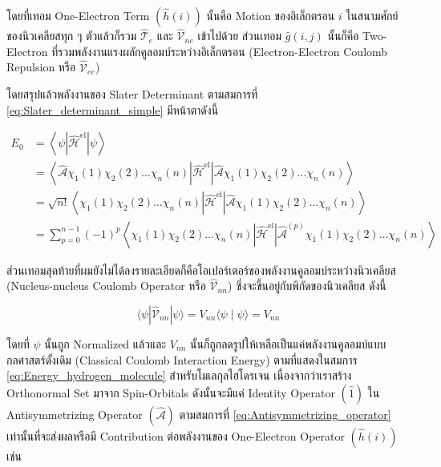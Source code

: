 \noindent โดยที่เทอม One-Electron Term $(\hat{h}(i))$ นั้นคือ Motion ของอิเล็กตรอน $i$ ในสนามศักย์ของนิวเคลียสทุก ๆ
ตัวแล้วก็รวม $\hat{\mathscr{T}}_e$ และ $\hat{\mathscr{V}}_{n e}$ เข้าไปด้วย ส่วนเทอม $\hat{g}(i, j)$ นั้นก็คือ Two-Electron
ที่รวมพลังงานแรงผลักคูลอมบ์ระหว่างอิเล็กตรอน (Electron-Electron Coulomb Repulsion หรือ $\hat{\mathscr{V}}_{e e}$)

โดยสรุปแล้วพลังงานของ Slater Determinant ตามสมการที่ \eqref{eq:Slater_determinant_simple} มีหน้าตาดังนี้

\begin{equation}
    \label{eq:energy_Slater_determinant}
    \begin{aligned}
        E_0
         & = \left\langle\psi
        \left|\hat{\mathscr{H}}^{\mathrm{el}}\right| \psi\right\rangle             \\
         & = \left\langle\hat{\mathscr{A}} \chi_1(1) \chi_2(2) \dots \chi_n(n)
        \left|\hat{\mathscr{H}}^{\mathrm{el}}\right|
        \hat{\mathscr{A}} \chi_1(1) \chi_2(2) \dots \chi_n(n)\right\rangle         \\
         & = \sqrt{n !}\left\langle\chi_1(1) \chi_2(2) \dots \chi_n(n)
        \left|\hat{\mathscr{H}}^{\mathrm{el}}\right|
        \hat{\mathscr{A}} \chi_1(1) \chi_2(2) \dots \chi_n(n)\right\rangle         \\
         & = \sum_{p=0}^{n-1}(-1)^p\left\langle\chi_1(1) \chi_2(2) \dots \chi_n(n)
        \left|\hat{\mathscr{H}}^{\mathrm{el}}\right|
        \hat{\mathscr{A}}^{(p)} \chi_1(1) \chi_2(2) \dots \chi_n(n)\right\rangle
    \end{aligned}
\end{equation}

ส่วนเทอมสุดท้ายที่ผมยังไม่ได้ลงรายละเอียดก็คือโอเปอร์เตอร์ของพลังงานคูลอมบ์ระหว่างนิวเคลียส (Nucleus-nucleus Coulomb Operator หรือ
$\hat{\mathscr{V}}_{n n}$) ซึ่งจะขึ้นอยู่กับพิกัดของนิวเคลียส ดังนี้

\begin{equation}
    \langle\psi|\hat{\mathscr{V}}_{n n}| \psi\rangle
    = V_{n n}\langle\psi \mid \psi\rangle
    = V_{n n}
\end{equation}

\noindent โดยที่ $\psi$ นั้นถูก Normalized แล้วและ $V_{n n}$ นั้นก็ถูกลดรูปให้เหลือเป็นแค่พลังงานคูลอมบ์แบบกลศาสตร์ดั้งเดิม
(Classical Coulomb Interaction Energy) ตามที่แสดงในสมการ \eqref{eq:Energy_hydrogen_molecule} สำหรับโมเลกุลไฮโดรเจน
เนื่องจากว่าเราสร้าง Orthonormal Set มาจาก Spin-Orbitals ดังนั้นจะมีแค่ Identity Operator $(\hat{1})$ ใน Antisymmetrizing
Operator $(\hat{\mathscr{A}})$ ตามสมการที่ \eqref{eq:Antisymmetrizing_operator} เท่านั้นที่จะส่งผลหรือมี Contribution
ต่อพลังงานของ One-Electron Operator $(\hat{h}(i))$ เช่น

